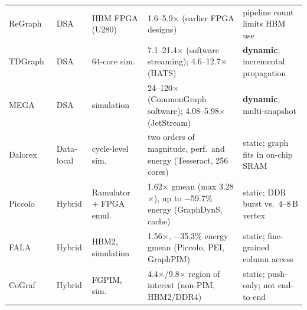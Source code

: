 \documentclass[journal,onecolumn]{IEEEtran}
\begin{document}
\begin{table}[t]
\begin{tabularx}{\textwidth}{@{}L{2.3cm}L{1.1cm}L{3.0cm}YL{4.0cm}@{}}
ReGraph~\cite{chen2022regraph} & DSA & HBM FPGA (U280) & 1.6--5.9$\times$ (earlier FPGA designs) & pipeline count limits HBM use \\
TDGraph~\cite{zhao2022tdgraph} & DSA & 64-core sim.\ & 7.1--21.4$\times$ (software streaming); 4.6--12.7$\times$ (HATS) & \textbf{dynamic}; incremental propagation \\
MEGA~\cite{gao2023mega} & DSA & simulation & 24--120$\times$ (CommonGraph software); 4.08--5.98$\times$ (JetStream) & \textbf{dynamic}; multi-snapshot \\
Dalorex~\cite{orenesvera2023dalorex} & Data-local & cycle-level sim.\ & two orders of magnitude, perf.\ and energy (Tesseract, 256 cores) & static; graph fits in on-chip SRAM \\
Piccolo~\cite{shin2025piccolo} & Hybrid & Ramulator + FPGA emul.\ & 1.62$\times$ gmean (max 3.28$\times$), up to $-$59.7\% energy (GraphDynS, cache) & static; DDR burst vs.\ 4--8\,B vertex \\
FALA~\cite{shin2025fala} & Hybrid & HBM2, simulation & 1.56$\times$, $-$35.3\% energy gmean (Piccolo, PEI, GraphPIM) & static; fine-grained column access \\
CoGraf~\cite{yenimol2026cograf} & Hybrid & FGPIM, sim.\ & 4.4$\times$/9.8$\times$ region of interest (non-PIM, HBM2/DDR4) & static; push-only; not end-to-end \\
\bottomrule
\end{tabularx}
\end{table}
\end{document}
